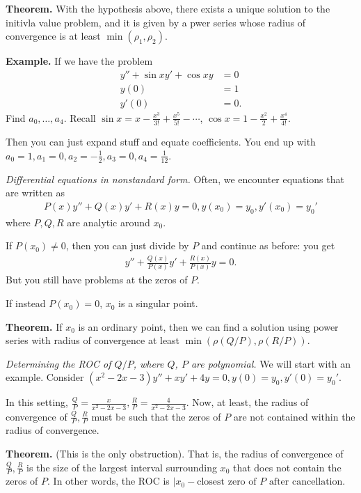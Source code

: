 \documentclass{article}
\begin{document}
{\bf Theorem.} With the hypothesis above, there exists a unique solution to the initivla value problem, and it is given by a pwer series whose radius of convergence is at least $\min(\rho_1, \rho_2)$.

{\bf Example.} If we have the problem
\begin{align*}
  y'' + \sin x y' + \cos x y &= 0 \\
  y(0) &= 1 \\
  y'(0) &= 0.
\end{align*}
Find $a_0, \dots, a_4$. Recall $\sin x = x - \frac{x^3}{3!} + \frac{x^5}{5!} - \cdots$, $\cos x = 1 - \frac{x^2}{2} + \frac{x^4}{4!}$.

Then you can just expand stuff and equate coefficients.  You end up with $a_0 = 1, a_1 = 0, a_2 = - \frac{1}{2}, a_3 = 0, a_4 = \frac{1}{12}$.

{\it Differential equations in nonstandard form.} Often, we encounter equations that are written as
\begin{align*}
  P(x) y'' + Q(x) y' + R(x) y = 0, y(x_0) = y_0, y'(x_0) = y_0'
\end{align*}
where $P, Q, R$ are analytic around $x_0$.

If $P(x_0) \neq 0$, then you can just divide by $P$ and continue as before: you get
\begin{align*}
  y'' + \frac{Q(x)}{P(x)}y' + \frac{R(x)}{P(x)} y = 0.
\end{align*}
But you still have problems at the zeros of $P$.

If instead $P(x_0) = 0$, $x_0$ is a singular point.

{\bf Theorem.} If $x_0$ is an ordinary point, then we can find a solution using power series with radius of convergence at least $\min \left( \rho (Q/P), \rho(R/P) \right)$.

{\it Determining the ROC of $Q/P$, where $Q$, $P$ are polynomial.}  We will start with an example. Consider $(x^2 - 2x - 3)  y'' + xy' + 4y = 0, y(0) = y_0, y'(0) = y_0'$.

In this setting, $\frac{Q}{P} = \frac{x}{x^2 - 2x - 3}, \frac{R}{P} = \frac{4}{x^2 - 2x - 3}$.  Now, at least, the radius of convergence of $\frac{Q}{P}, \frac{R}{P}$ must be such that the zeros of $P$ are not contained within the radius of convergence.

{\bf Theorem.} (This is the only obstruction).  That is, the radius of convergence of $\frac{Q}{P}, \frac{R}{P}$ is the size of the largest interval surrounding $x_0$ that does not contain the zeros of $P$.   In other words, the ROC is $|x_0 - \text{closest zero of $P$ after cancellation}$.
\end{document}

